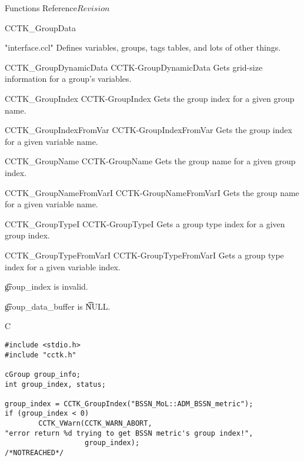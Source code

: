 \begin{cactuspart}{ Functions Reference}{}{$Revision$}
\begin{FunctionDescription}{CCTK\_GroupData}
\begin{SeeAlsoSection}
\begin{SeeAlso}{"interface.ccl"}
Defines variables, groups, tags tables, and lots of other things.
\end{SeeAlso}
\begin{SeeAlso2} {CCTK\_GroupDynamicData} {CCTK-GroupDynamicData}
Gets grid-size information for a group's variables.
\end{SeeAlso2}
\begin{SeeAlso2} {CCTK\_GroupIndex} {CCTK-GroupIndex}
Gets the group index for a given group name.
\end{SeeAlso2}
\begin{SeeAlso2} {CCTK\_GroupIndexFromVar} {CCTK-GroupIndexFromVar}
Gets the group index for a given variable name.
\end{SeeAlso2}
\begin{SeeAlso2} {CCTK\_GroupName} {CCTK-GroupName}
Gets the group name for a given group index.
\end{SeeAlso2}
\begin{SeeAlso2} {CCTK\_GroupNameFromVarI} {CCTK-GroupNameFromVarI}
Gets the group name for a given variable name.
\end{SeeAlso2}
\begin{SeeAlso2} {CCTK\_GroupTypeI} {CCTK-GroupTypeI}
Gets a group type index for a given group index.
\end{SeeAlso2}
\begin{SeeAlso2} {CCTK\_GroupTypeFromVarI} {CCTK-GroupTypeFromVarI}
Gets a group type index for a given variable index.
\end{SeeAlso2}
\end{SeeAlsoSection}

\begin{ErrorSection}
\begin{Error}{-1}
{\t group\_index} is invalid.
\end{Error}
\begin{Error}{-2}
{\t group\_data\_buffer} is {\t NULL}.
\end{Error}
\end{ErrorSection}

\begin{ExampleSection}
\begin{Example}{C}
\begin{verbatim}
#include <stdio.h>
#include "cctk.h"

cGroup group_info;
int group_index, status;

group_index = CCTK_GroupIndex("BSSN_MoL::ADM_BSSN_metric");
if (group_index < 0)
        CCTK_VWarn(CCTK_WARN_ABORT,
"error return %d trying to get BSSN metric's group index!",
                   group_index);                                /*NOTREACHED*/


\end{verbatim}
\end{Example}
\end{ExampleSection}
\end{FunctionDescription}
\end{cactuspart}
